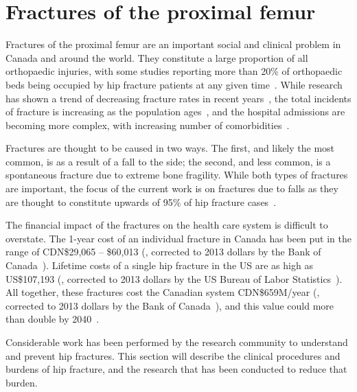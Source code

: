 \section{Fractures of the proximal femur}
\label{sec:intro_fractures}
Fractures of the proximal femur are an important social and clinical problem in Canada and around the world.
They constitute a large proportion of all orthopaedic injuries, with some studies reporting more than 20\% of orthopaedic beds being occupied by hip fracture patients at any given time~\citep{torgerson_letter:_2000}.
While research has shown a trend of decreasing fracture rates in recent years~\citep{lefaivre_changes_2011}, the total incidents of fracture is increasing as the population ages~\citep{wiktorowicz_economic_2001}, and the hospital admissions are becoming more complex, with increasing number of comorbidities~\citep{sirois_burden_2009}.

Fractures are thought to be caused in two ways.
The first, and likely the most common, is as a result of a fall to the side; the second, and less common, is a spontaneous fracture due to extreme bone fragility.
While both types of fractures are important, the focus of the current work is on fractures due to falls as they are thought to constitute upwards of 95\% of hip fracture cases~\citep{parkkari_majority_1999}.

The financial impact of the fractures on the health care system is difficult to overstate.
The 1-year cost of an individual fracture in Canada has been put in the range of CDN\$29,065 -- \$60,013 (\citep{wiktorowicz_economic_2001}, corrected to 2013 dollars by the Bank of Canada~\citep{bank_of_canada_inflation_2013}).
Lifetime costs of a single hip fracture in the US are as high as US\$107,193 (\citep{braithwaite_estimating_2003}, corrected to 2013 dollars by the US Bureau of Labor Statistics~\citep{bureau_of_labor_statistics_cpi_2013}).
All together, these fractures cost the Canadian system CDN\$659M/year (\citep{tarride_burden_2012}, corrected to 2013 dollars by the Bank of Canada~\citep{bank_of_canada_inflation_2013}), and this value could more than double by 2040~\citep{wiktorowicz_economic_2001}.

Considerable work has been performed by the research community to understand and prevent hip fractures.
This section will describe the clinical procedures and burdens of hip fracture, and the research that has been conducted to reduce that burden.

